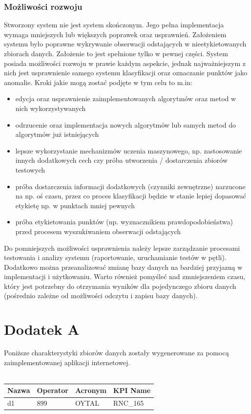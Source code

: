 \documentclass[eng,printmode]{mgr}
\begin{document}
\subsection{Możliwości rozwoju}
Stworzony system nie jest system skończonym. Jego pełna implementacja wymaga mniejszych lub większych poprawek oraz usprawnień. Założeniem systemu było poprawne wykrywanie obserwacji odstających w nieetykietowanych zbiorach danych. Założenie to jest spełnione tylko w pewnej części. System posiada możliwości rozwoju w prawie każdym aspekcie, jednak najważniejszym z nich jest usprawnienie samego systemu klasyfikacji oraz oznaczanie punktów jako anomalie. Kroki jakie mogą zostać podjęte w tym celu to m.in:
\begin{itemize}
  \item edycja oraz usprawnienie zaimplementowanych algorytmów oraz metod w nich wykorzystywanych
  \item odrzucenie oraz implementacja nowych algorytmów lub samych metod do algorytmów już istniejących
  \item lepsze wykorzystanie mechanizmów uczenia maszynowego, np. zastosowanie innych dodatkowych cech czy próba utworzenia / dostarczenia zbiorów testowych
  \item próba dostarczenia informacji dodatkowych (czynniki zewnętrzne) narzucone na np. oś czasu, przez co proces klasyfikacji będzie w stanie lepiej dopasować etykietę np. w punktach mniej pewnych
  \item próba etykietowania punktów (np. wyznacznikiem prawdopodobieństwa) przed procesem wyszukiwaniem obserwacji odstających 
\end{itemize}
Do pomniejszych możliwości usprawnienia należy lepsze zarządzanie procesami testowania i analizy systemu (raportowanie, uruchamianie testów w pętli). Dodatkowo można przeanalizować zmianę bazy danych na bardziej przyjazną w implementacji i użytkowaniu. Warto również pomyśleć nad zmniejszeniem czasu, który jest potrzebny do otrzymania wyników dla pojedynczego zbioru danych (pośrednio zależne od możliwości odczytu i zapisu bazy danych).

\chapter{Dodatek A}
Poniższe charakterystyki zbiorów danych zostały wygenerowane za pomocą zaimplementowanej aplikacji internetowej.
\\\\

\begingroup
\fontsize{10pt}{12pt}\selectfont
\begin{tabu} to 0.9\textwidth { | X[l] | X[l] | X[l] | X[l] |}
\hline
\textbf{Nazwa} & \textbf{Operator} & \textbf{Acronym} & \textbf{KPI Name} \\
\hline
d1 & 899 & OYTAL & RNC\_165 \\
\hline
\end{tabu}
\endgroup
\end{document}
